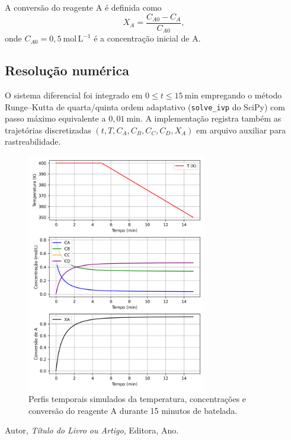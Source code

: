 \documentclass{article}
\begin{document}
A conversão do reagente A é definida como
\begin{equation}
  X_A = \frac{C_{A0} - C_A}{C_{A0}}, \label{eq:conversao-q3}
\end{equation}
onde $C_{A0} = 0{,}5\ \mathrm{mol\,L^{-1}}$ é a concentração inicial de A.

\subsection*{Resolução numérica}
O sistema diferencial foi integrado em $0 \leq t \leq 15\ \mathrm{min}$ empregando o método Runge--Kutta de quarta/quinta ordem adaptativo (\texttt{solve\_ivp} do SciPy) com passo máximo equivalente a $0{,}01\ \mathrm{min}$. A implementação registra também as trajetórias discretizadas $(t, T, C_A, C_B, C_C, C_D, X_A)$ em arquivo auxiliar para rastreabilidade.



\begin{figure}[h!]
  \centering
  \includegraphics[width=0.7\textwidth]{figuras/questao3_reator.png}
  \caption{Perfis temporais simulados da temperatura, concentrações e conversão do reagente A durante 15 minutos de batelada.}
  \label{fig:questao3}
\end{figure}

\begin{thebibliography}{9}
  Autor, \emph{Título do Livro ou Artigo}, Editora, Ano.
\end{thebibliography}
\end{document}
